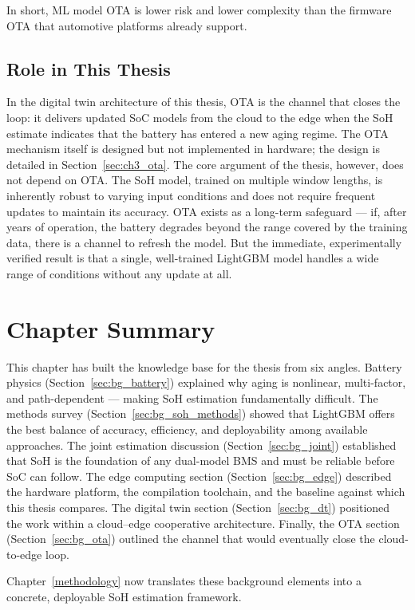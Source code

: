 In short, ML model OTA is lower risk and lower complexity than the firmware OTA that automotive platforms already support.

\subsection{Role in This Thesis}

In the digital twin architecture of this thesis, OTA is the channel that closes the loop: it delivers updated SoC models from the cloud to the edge when the SoH estimate indicates that the battery has entered a new aging regime. The OTA mechanism itself is designed but not implemented in hardware; the design is detailed in Section~\ref{sec:ch3_ota}. The core argument of the thesis, however, does not depend on OTA. The SoH model, trained on multiple window lengths, is inherently robust to varying input conditions and does not require frequent updates to maintain its accuracy. OTA exists as a long-term safeguard --- if, after years of operation, the battery degrades beyond the range covered by the training data, there is a channel to refresh the model. But the immediate, experimentally verified result is that a single, well-trained LightGBM model handles a wide range of conditions without any update at all.


\section{Chapter Summary}

This chapter has built the knowledge base for the thesis from six angles. Battery physics (Section~\ref{sec:bg_battery}) explained why aging is nonlinear, multi-factor, and path-dependent --- making SoH estimation fundamentally difficult. The methods survey (Section~\ref{sec:bg_soh_methods}) showed that LightGBM offers the best balance of accuracy, efficiency, and deployability among available approaches. The joint estimation discussion (Section~\ref{sec:bg_joint}) established that SoH is the foundation of any dual-model BMS and must be reliable before SoC can follow. The edge computing section (Section~\ref{sec:bg_edge}) described the hardware platform, the compilation toolchain, and the baseline against which this thesis compares. The digital twin section (Section~\ref{sec:bg_dt}) positioned the work within a cloud--edge cooperative architecture. Finally, the OTA section (Section~\ref{sec:bg_ota}) outlined the channel that would eventually close the cloud-to-edge loop.

Chapter~\ref{methodology} now translates these background elements into a concrete, deployable SoH estimation framework.
